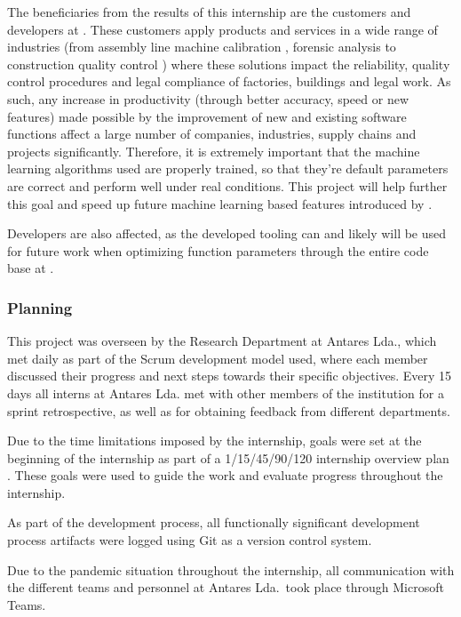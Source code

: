 The beneficiaries from the results of this internship are the customers and developers at \faro. These customers apply \faro products and services in a wide range of industries (from assembly line machine calibration \parencite{faro_man_eq_align}, forensic analysis \parencite{faro_forensic} to construction quality control \parencite{faro_construction}) where these solutions impact the reliability, quality control procedures and legal compliance of factories, buildings and legal work. As such, any increase in productivity (through better accuracy, speed or new features) made possible by the improvement of new and existing software functions affect a large number of companies, industries, supply chains and projects significantly. Therefore, it is extremely important that the machine learning algorithms used are properly trained, so that they're default parameters are correct and perform well under real conditions. This project will help further this goal and speed up future machine learning based features introduced by \faro.

Developers are also affected, as the developed tooling can and likely will be used for future work when optimizing function parameters through the entire code base at \faro.

\subsubsection{Planning}

This project was overseen by the Research Department at Antares Lda., which met daily as part of the Scrum development model used, where each member discussed their progress and next steps towards their specific objectives. Every 15 days all interns at Antares Lda. met with other members of the institution for a sprint retrospective, as well as for obtaining feedback from different departments.

Due to the time limitations imposed by the internship, goals were set at the beginning of the internship as part of a 1/15/45/90/120 internship overview plan . These goals were used to guide the work and evaluate progress throughout the internship.

As part of the development process, all functionally significant development process artifacts were logged using Git as a version control system.

Due to the pandemic situation throughout the internship, all communication with the different teams and personnel at Antares Lda.~took place through Microsoft Teams.